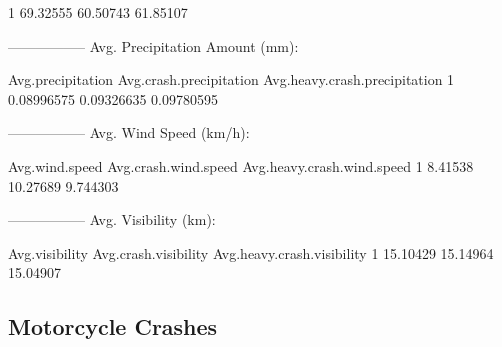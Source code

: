\documentclass[11pt, a4paper]{article}
\begin{document}
\begin{Schunk}
\begin{Soutput}
1     69.32555           60.50743                 61.85107
\end{Soutput}
\begin{Soutput}
-----------------
Avg. Precipitation Amount (mm):
\end{Soutput}
\begin{Soutput}
  Avg.precipitation Avg.crash.precipitation Avg.heavy.crash.precipitation
1        0.08996575              0.09326635                    0.09780595
\end{Soutput}
\begin{Soutput}
-----------------
Avg. Wind Speed (km/h):
\end{Soutput}
\begin{Soutput}
  Avg.wind.speed Avg.crash.wind.speed Avg.heavy.crash.wind.speed
1        8.41538             10.27689                   9.744303
\end{Soutput}
\begin{Soutput}
-----------------
Avg. Visibility (km):
\end{Soutput}
\begin{Soutput}
  Avg.visibility Avg.crash.visibility Avg.heavy.crash.visibility
1       15.10429             15.14964                   15.04907
\end{Soutput}
\end{Schunk}



\pagebreak
\subsection{Motorcycle Crashes}
\end{document}
